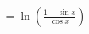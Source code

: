 \documentclass[preview]{standalone}
\begin{document}
\begin{align*}
=\ln\left( \frac{1 + \sin{x}}{\cos{x}} \right)
\end{align*}
\end{document}
